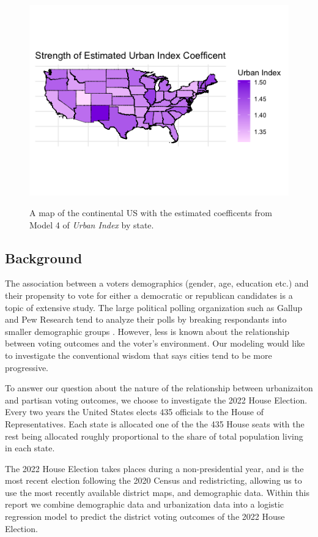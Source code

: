 \documentclass[12pt]{article}
\begin{document}
\begin{figure}[!h]
	\includegraphics[width=\linewidth]{figures/beginning_image.png}
	\label{map:urban_index_by_state}
	\caption{A map of the continental US with the estimated coefficents from Model 4 of \textit{Urban Index} by state. }
\end{figure}

\subsection*{Background}
The association between a voters demographics (gender, age, education etc.) and their propensity to vote for either a democratic or republican candidates is a topic of extensive study. The large political polling organization such as Gallup and Pew Research tend to analyze their polls by breaking respondants into smaller demographic groups \parencite{pew2020}. However, less is known about the relationship between voting outcomes and the voter's environment. Our modeling would like to investigate the conventional wisdom that says cities tend to be more progressive. 

To answer our question about the nature of the relationship between urbanizaiton and partisan voting outcomes, we choose to investigate the 2022 House Election. Every two years the United States elects 435 officials to the House of Representatives. Each state is allocated one of the the 435 House seats with the rest being allocated roughly proportional to the share of total population living in each state. 

The 2022 House Election takes places during a non-presidential year, and is the most recent election following the 2020 Census and redistricting, allowing us to use the most recently available district maps, and demographic data. Within this report we combine demographic data and urbanization data into a logistic regression model to predict the district voting outcomes of the 2022 House Election. 
\end{document}
